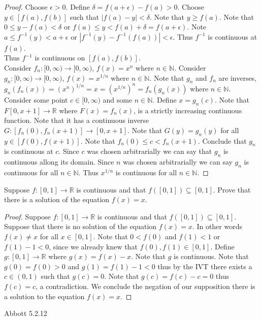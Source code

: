\documentclass[12pt]{article}
\makeatletter
\theoremstyle{homework}
\newenvironment{exercise}[1]
{\def\@currentlabel{#1}\exercisecore}
{\endexercisecore}
\makeatother
\begin{document}
\begin{proof}
Choose $\epsilon>0$.  Define $\delta=f(a+\epsilon)-f(a)>0$.  Choose $y\in [f(a), f(b)]$ such that $|f(a)-y|<\delta$.  Note that $y\geq f(a)$.  Note that $0 \leq y-f(a)<\delta$ or $f(a) \leq y<f(a)+\delta=f(a+\epsilon)$.  Note $a \leq f^{-1}(y)<a+\epsilon$ or $|f^{-1}(y)-f^{-1}(f(a))|<\epsilon$.  Thus $f^{-1}$ is continuous at $f(a)$.\\
Thus $f^{-1}$ is continuous on $[f(a),f(b)]$.\\
Consider $f_n:[0,\infty)\rightarrow [0,\infty)$, $f(x)=x^n$ where $n\in\mathbb{N}$.  Consider $g_n:[0,\infty)\rightarrow [0,\infty)$, $f(x)=x^{1/n}$ where $n\in\mathbb{N}$.  Note that $g_n$ and $f_n$ are inverses, $g_n (f_n(x))=(x^n)^{1/n}=x=(x^{1/n})^n=f_n (g_n (x))$ where $n\in\mathbb{N}$.  Consider some point $c\in [0,\infty)$ and some $n\in\mathbb{N}$.  Define $x=g_n(c)$.  Note that $F [0,x+1]\rightarrow \mathbb{R}$ where $F(x)=f_n(x)$, is a strictly increasing continuous function.  Note that it has a continuous inverse $G : [f_n(0),f_n(x+1)]\rightarrow [0,x+1]$.  Note that $G(y)=g_n(y)$ for all $y\in [f(0),f(x+1)]$.  Note that $f_n(0)\leq c<f_n(x+1)$.  Conclude that $g_n$ is continuous at $c$.  Since $c$ was chosen arbitrarially we can say that $g_n$ is continuous allong its domain.  Since $n$ was chosen arbitrarially we can say $g_n$ is continuous for all $n\in\mathbb{N}$.  Thus $x^{1/n}$ is continuous for all $n\in\mathbb{N}$.
\end{proof}
\begin{exercise} 8
Suppose $f : [0,1] \rightarrow\mathbb{R}$ is continuous and that $f ([0,1]) \subseteq [0,1]$.  Prove that there is a solution of the equation $f (x) = x$.
\end{exercise}
\begin{proof}
Suppose $f : [0,1] \rightarrow\mathbb{R}$ is continuous and that $f ([0,1]) \subseteq [0,1]$.  Suppose that there is no solution of the equation $f (x) = x$.  In other words $f(x)\neq x$ for all $x\in [0,1]$.  Note that $0<f(0)$ and $f(1)<1$ or $f(1)-1<0$, since we already knew that $f(0),f(1)\in[0,1]$.  Define $g:[0,1]\rightarrow \mathbb{R}$ where $g(x)=f(x)-x$.  Note that $g$ is continuous.  Note that $g(0)=f(0)>0$ and $g(1)=f(1)-1<0$ thus by the IVT there exists a $c\in (0,1)$ such that $g(c)=0$.  Note that $g(c)=f(c)-c=0$ thus $f(c)=c$, a contradiction.  We conclude the negation of our supposition there is a solution to the equation $f (x) = x$.
\end{proof}
\begin{exercise} 9
Abbott 5.2.12
\end{exercise}
\end{document}
